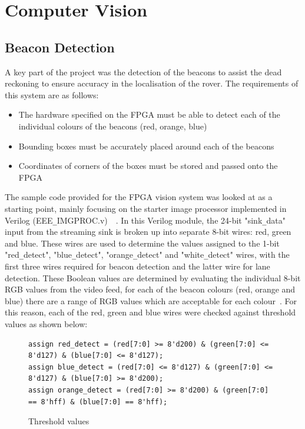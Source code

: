\section{Computer Vision}
\subsection{Beacon Detection}
A key part of the project was the detection of the beacons to assist the dead reckoning to ensure accuracy in the localisation of the rover.
The requirements of this system are as follows:

\begin{itemize}
    \item The hardware specified on the FPGA must be able to detect each of the individual colours of the beacons (red, orange, blue)
    \item Bounding boxes must be accurately placed around each of the beacons
    \item Coordinates of corners of the boxes must be stored and passed onto the FPGA
\end{itemize}

The sample code provided for the FPGA vision system was looked at as a starting point, mainly focusing on the starter image processor implemented in Verilog (EEE\verb|_|IMGPROC.v)~\cite{ref:eebalancebug}~\cite{ref:fpga_starter}. In this Verilog module, the 24-bit "sink\verb|_|data" input from the streaming sink is broken up into separate 8-bit wires: red, green and blue. These wires are used to determine the values assigned to the 1-bit "red\verb|_|detect", "blue\verb|_|detect", "orange\verb|_|detect" and "white\verb|_|detect" wires, with the first three wires required for beacon detection and the latter wire for lane detection. These Boolean values are determined by evaluating the individual 8-bit RGB values from the video feed, for each of the beacon colours (red, orange and blue) there are a range of RGB values which are acceptable for each colour~\cite{ref:rgbhsv}. For this reason, each of the red, green and blue wires were checked against threshold values as shown below:

\begin{figure}
    \footnotesize
    \begin{verbatim}
assign red_detect = (red[7:0] >= 8'd200) & (green[7:0] <= 8'd127) & (blue[7:0] <= 8'd127);
assign blue_detect = (red[7:0] <= 8'd127) & (green[7:0] <= 8'd127) & (blue[7:0] >= 8'd200);
assign orange_detect = (red[7:0] >= 8'd200) & (green[7:0] == 8'hff) & (blue[7:0] == 8'hff);
    \end{verbatim}
    \caption{Threshold values}
    \label{code:vision1}
\end{figure}

